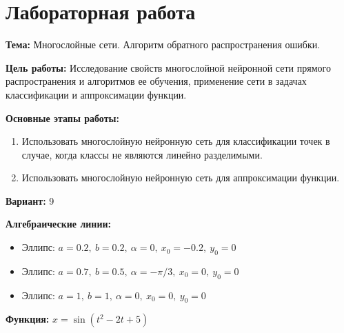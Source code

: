 \section*{Лабораторная работа }

{\bfseries Тема:} Многослойные сети. Алгоритм обратного распространения ошибки.

{\bfseries Цель работы:} Исследование свойств многослойной нейронной сети прямого распространения и алгоритмов ее обучения, применение сети в задачах классификации и аппроксимации функции.

{\bfseries Основные этапы работы:}
\begin{enumerate}
	\item Использовать многослойную нейронную сеть для классификации точек в случае, когда классы не являются линейно разделимыми.
	\item Использовать многослойную нейронную сеть для аппроксимации функции.
\end{enumerate}

{\bfseries Вариант:} 9

{\bfseries Алгебраические линии:}
\begin{itemize}
	\item Эллипс: $a = 0.2,\ b = 0.2,\ \alpha = 0,\ x_0 = -0.2,\ y_0 = 0$
	\item Эллипс: $a = 0.7,\ b = 0.5,\ \alpha = -\pi/3,\ x_0 = 0,\ y_0 = 0$
	\item Эллипс: $a = 1,\ b = 1,\ \alpha = 0,\ x_0 = 0,\ y_0 = 0$
\end{itemize}

{\bfseries Функция:} $x = \sin(t ^ 2 - 2t + 5)$

\pagebreak
